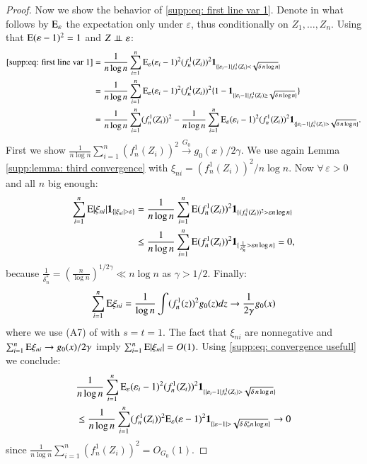 \begin{proof}
		Now we show the behavior of \eqref{supp:eq: first line var 1}. Denote in what follows by $\mathrm{E}_{\varepsilon}$ the expectation only under $\varepsilon$, thus conditionally on $Z_1,\ldots,Z_n$. Using that $\mathrm{E}(\varepsilon -1)^2 =1$ and $Z \perp \!\!\! \perp \varepsilon$:
		\begin{align*}
			\eqref{supp:eq: first line var 1} & = \frac{1}{n \log n} \sum_{i=1}^n \mathrm{E}_{\varepsilon} (\varepsilon_i - 1)^2 (f_n^1(Z_i))^2 \mathbf{1}_{\{|\varepsilon_i - 1| f_n^1(Z_i) < \sqrt{\delta \, n \log n}\}} \\
			& = \frac{1}{n \log n} \sum_{i=1}^n \mathrm{E}_{\varepsilon} (\varepsilon_i - 1)^2 (f_n^1(Z_i))^2 \{1 - \mathbf{1}_{\{|\varepsilon_i - 1| f_n^1(Z_i) \geq  \sqrt{\delta \, n \log n}\}} \} \\
			& = \frac{1}{n \log n} \sum_{i=1}^n (f_n^1(Z_i))^2 - \frac{1}{n \log n} \sum_{i=1}^n \mathrm{E}_{\varepsilon} (\varepsilon_i - 1)^2 (f_n^1(Z_i))^2 \mathbf{1}_{\{|\varepsilon_i - 1| f_n^1(Z_i) > \sqrt{\delta \, n \log n}\}}.
		\end{align*}
		First we show $\frac{1}{n \log n} \sum_{i=1}^n (f_n^1(Z_i))^2 \overset{G_0}{\to} g_0(x)/2\gamma$. We use again Lemma \ref{supp:lemma: third convergence} with $\xi_{ni} = (f_n^1(Z_i))^2/n\log n$. Now $\forall \, \varepsilon > 0$ and all $n$ big enough:
		\begin{align*}
		\sum_{i=1}^n \mathrm{E} |\xi_{ni}| \mathbf{1}_{\{|\xi_{ni}| > \varepsilon\}} &= \frac{1}{n\log n} \sum_{i=1}^n \mathrm{E} (f_n^1(Z_i))^2 \mathbf{1}_{\{(f_n^1(Z_i))^2 > \varepsilon n\log n\}} \\
		& \leq \frac{1}{n\log n} \sum_{i=1}^n \mathrm{E} (f_n^1(Z_i))^2 \mathbf{1}_{\{\frac{1}{\delta_n^*} > \varepsilon n\log n\}} = 0,
		\end{align*}
		because $\frac{1}{\delta_n^*} = (\frac{n}{\log n})^{1/2\gamma} \ll n \log n$ as $\gamma > 1/2$. Finally:
		\[
		\sum_{i=1}^n \mathrm{E} \xi_{ni} = \frac{1}{\log n} \int (f_n^1(z))^2 g_0(z) dz \to \frac{1}{2\gamma} g_0(x)
		\]
		where we use (A7) of \cite{27} with $s=t=1$. The fact that $\xi_{ni}$ are nonnegative and $\sum_{i=1}^n \mathrm{E} \xi_{ni} \to g_0(x)/2\gamma$ imply $\sum_{i=1}^n \mathrm{E} |\xi_{ni}| = O(1)$. Using \eqref{supp:eq: convergence usefull} we conclude:
		\begin{align*}
			& \frac{1}{n \log n} \sum_{i=1}^n \mathrm{E}_{\varepsilon} (\varepsilon_i - 1)^2 (f_n^1(Z_i))^2 \mathbf{1}_{\{|\varepsilon_i - 1| f_n^1(Z_i) > \sqrt{\delta \, n \log n}\}} \\
			& \leq \frac{1}{n \log n} \sum_{i=1}^n (f_n^1(Z_i))^2 \mathrm{E}_{\varepsilon} (\varepsilon - 1)^2 \mathbf{1}_{\{|\varepsilon - 1| > \sqrt{\delta \, \delta_n^* n \log n}\}} \to 0
		\end{align*}
		since $\frac{1}{n \log n} \sum_{i=1}^n (f_n^1(Z_i))^2 = O_{\scriptscriptstyle{G_0}}(1)$. 


\end{proof}
